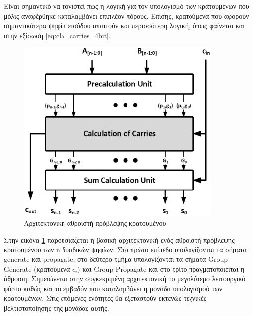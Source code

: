 Είναι σημαντικό να τονιστεί πως η λογική για τον υπολογισμό των κρατουμένων που μόλις αναφέρθηκε καταλαμβάνει επιπλέον πόρους. Επίσης, κρατούμενα που αφορούν σημαντικότερα ψηφία εισόδου απαιτούν και περισσότερη λογική, όπως φαίνεται και στην εξίσωση \ref{eq:cla_carries_4bit}.


\begin{figure}[H]
    \centering
    \includegraphics[height=9cm,width=10cm]{Pictures/CLA_Architecture.png}
    \caption{Αρχιτεκτονική αθροιστή πρόβλεψης κρατουμένου}
    \label{cla_architecture}
\end{figure}

Στην εικόνα \ref{cla_architecture} παρουσιάζεται η βασική αρχιτεκτονική ενός αθροιστή πρόβλεψης κρατουμένου των n δυαδικών ψηφίων. Στο πρώτο επίπεδο υπολογίζονται τα σήματα generate και propagate, στο δεύτερο τμήμα υπολογίζονται τα σήματα Group Generate (κρατούμενα $c_i$) και Group Propagate και στο τρίτο πραγματοποιείται η άθροιση. Σημειώνεται στην συγκεκριμένη αρχιτεκτονική το μεγαλύτερο λειτουργικό φόρτο καθώς και το εμβαδόν που καταλαμβάνει η μονάδα υπολογισμού των κρατουμένων. Στις επόμενες ενότητες θα εξεταστούν εκτενώς τεχνικές βελτιστοποίησης της μονάδας αυτής.
